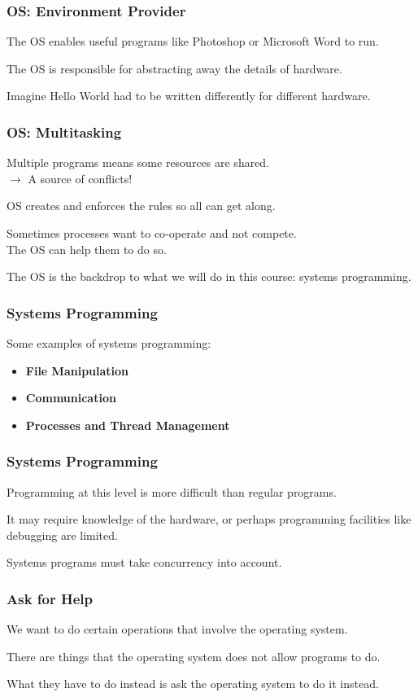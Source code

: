 \begin{frame}
\frametitle{OS: Environment Provider}

The OS enables useful programs like Photoshop or Microsoft Word to run. 

The OS is responsible for abstracting away the details of hardware.


Imagine Hello World had to be written differently for different hardware.


\end{frame}

\begin{frame}
\frametitle{OS: Multitasking}
Multiple programs means some resources are shared.\\
\quad $\rightarrow$ A source of conflicts!

OS creates and enforces the rules so all can get along.

Sometimes processes want to co-operate and not compete.\\
\quad The OS can help them to do so.

The OS is the backdrop to what we will do in this course: systems programming.

\end{frame}

\begin{frame}
\frametitle{Systems Programming}

Some examples of systems programming:

\begin{itemize}
	\item \textbf{File Manipulation}
	\item \textbf{Communication}
	\item \textbf{Processes and Thread Management}
\end{itemize}

\end{frame}

\begin{frame}
\frametitle{Systems Programming}

Programming at this level is more difficult than regular programs. 

It may require knowledge of the hardware, or perhaps programming facilities like debugging are limited. 

Systems programs must take concurrency into account.

\end{frame}


\begin{frame}
\frametitle{Ask for Help}

We want to do certain operations that involve the operating system. 

There are things that the operating system does not allow programs to do. 

What they have to do instead is ask the operating system to do it instead. 

\end{frame}

